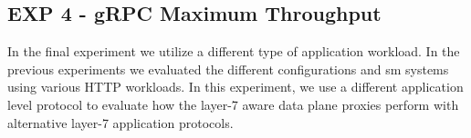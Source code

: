 
\subsection{\textbf{EXP 4} - gRPC Maximum Throughput}
\label{sec:experiments:results:per-experiment:04}

In the final experiment we utilize a different type of application workload. In the previous experiments we evaluated the different configurations and \gls{sm} systems using various HTTP workloads. In this experiment, we use a different application level protocol to evaluate how the layer-7 aware data plane proxies perform with alternative layer-7 application protocols. 



\begin{figure}[t]
\centering
{}
\end{figure}
